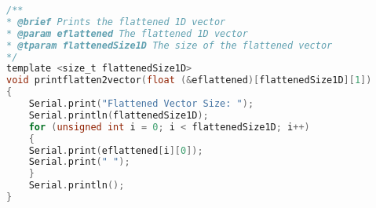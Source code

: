 \begin{lstlisting}[language=C, caption={Convolution functions}]
/**
* @brief Prints the flattened 1D vector
* @param eflattened The flattened 1D vector
* @tparam flattenedSize1D The size of the flattened vector 
*/
template <size_t flattenedSize1D>
void printflatten2vector(float (&eflattened)[flattenedSize1D][1])
{
    Serial.print("Flattened Vector Size: ");
    Serial.println(flattenedSize1D);
    for (unsigned int i = 0; i < flattenedSize1D; i++)
    {
    Serial.print(eflattened[i][0]);
    Serial.print(" ");
    }
    Serial.println();
}
\end{lstlisting}